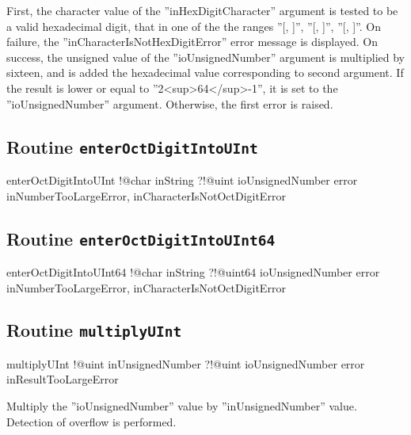 First, the character value of the ''inHexDigitCharacter'' argument is tested to be a valid hexadecimal digit, that in one of the the ranges ''[\textquotesingle, \textquotesingle]'', ''[\textquotesingle, \textquotesingle]'', ''[\textquotesingle, \textquotesingle]''. On failure, the ''inCharacterIsNotHexDigitError'' error message is displayed. On success, the unsigned value of the ''ioUnsignedNumber'' argument is multiplied by sixteen, and is added the hexadecimal value corresponding to second argument. If the result is lower or equal to ''2<sup>64</sup>-1'', it is set to the ''ioUnsignedNumber'' argument. Otherwise, the first error is raised.

\subsection{Routine \texttt{enterOctDigitIntoUInt}}

\begin{galgas}
enterOctDigitIntoUInt !@char inString
                      ?!@uint ioUnsignedNumber
                      error inNumberTooLargeError,
                            inCharacterIsNotOctDigitError
\end{galgas}

\subsection{Routine \texttt{enterOctDigitIntoUInt64}}

\begin{galgas}
enterOctDigitIntoUInt64 !@char inString
                        ?!@uint64 ioUnsignedNumber
                        error inNumberTooLargeError,
                              inCharacterIsNotOctDigitError
\end{galgas}

\subsection{Routine \texttt{multiplyUInt}}

\begin{galgas}
multiplyUInt !@uint inUnsignedNumber
             ?!@uint ioUnsignedNumber
             error inResultTooLargeError
\end{galgas}

Multiply the ''ioUnsignedNumber'' value by ''inUnsignedNumber'' value. Detection of overflow is performed.

